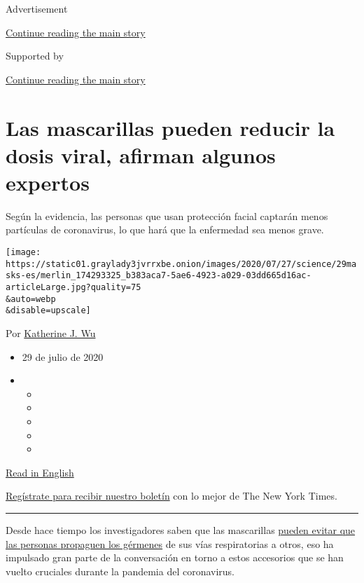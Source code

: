 Advertisement

\protect\hyperlink{after-top}{Continue reading the main story}

Supported by

\protect\hyperlink{after-sponsor}{Continue reading the main story}

\hypertarget{las-mascarillas-pueden-reducir-la-dosis-viral-afirman-algunos-expertos}{%
\section{Las mascarillas pueden reducir la dosis viral, afirman algunos
expertos}\label{las-mascarillas-pueden-reducir-la-dosis-viral-afirman-algunos-expertos}}

Según la evidencia, las personas que usan protección facial captarán
menos partículas de coronavirus, lo que hará que la enfermedad sea menos
grave.

\texttt{[image: https://static01.graylady3jvrrxbe.onion/images/2020/07/27/science/29masks-es/merlin\_174293325\_b383aca7-5ae6-4923-a029-03dd665d16ac-articleLarge.jpg?quality=75\\\&auto=webp\\\&disable=upscale]}

Por
\href{https://www.nytimes3xbfgragh.onion/by/katherine-j--wu}{Katherine
J. Wu}

\begin{itemize}
\item
  29 de julio de 2020
\item
  \begin{itemize}
  \item
  \item
  \item
  \item
  \item
  \end{itemize}
\end{itemize}

\href{https://www.nytimes3xbfgragh.onion/2020/07/27/health/coronavirus-mask-protection.html}{Read
in English}

\href{https://www.nytimes3xbfgragh.onion/newsletters/el-times}{Regístrate
para recibir nuestro boletín} con lo mejor de The New York Times.

\begin{center}\rule{0.5\linewidth}{\linethickness}\end{center}

Desde hace tiempo los investigadores saben que las mascarillas
\href{https://journals.plos.org/plospathogens/article?id=10.1371/journal.ppat.1003205}{pueden
evitar que las personas propaguen los gérmenes} de sus vías
respiratorias a otros, eso ha impulsado gran parte de la conversación en
torno a estos accesorios que se han vuelto cruciales durante la pandemia
del coronavirus.

